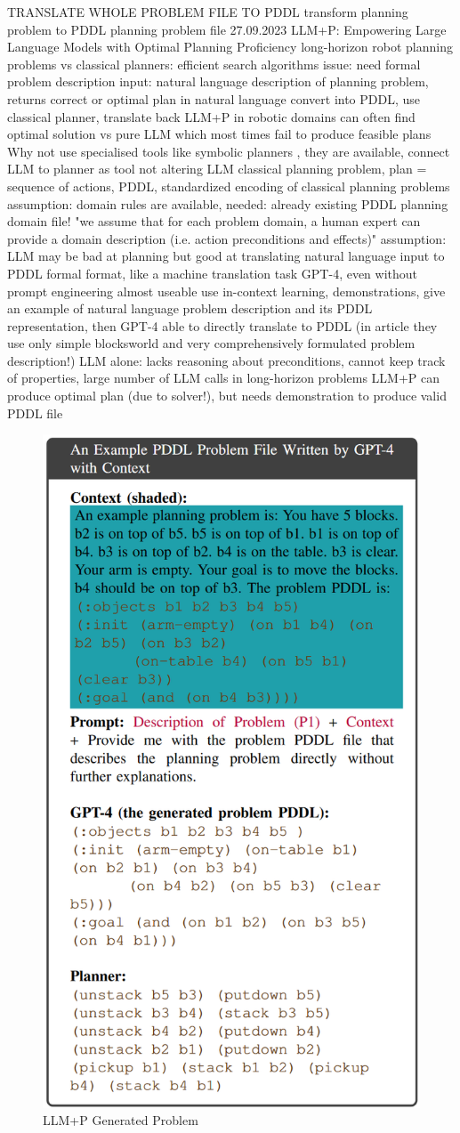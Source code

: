 \documentclass{article}
\begin{document}
TRANSLATE WHOLE PROBLEM FILE TO PDDL
transform planning problem to PDDL planning problem file
\cite{liu_llmp_2023} 27.09.2023 LLM+P: Empowering Large Language Models with Optimal Planning Proficiency
long-horizon robot planning problems
vs classical planners: efficient search algorithms
issue: need formal problem description
input: natural language description of planning problem, returns correct or optimal plan in natural language
convert into PDDL, use classical planner, translate back
LLM+P in robotic domains can often find optimal solution vs pure LLM which most times fail to produce feasible plans
Why not use specialised tools like symbolic planners , they are available, connect LLM to planner as tool
not altering LLM
classical planning problem, plan = sequence of actions, PDDL, standardized encoding of classical planning problems
assumption: domain rules are available, needed: already existing PDDL planning domain file! "we assume that for each problem domain, a human expert can provide a domain description (i.e. action preconditions and effects)"
assumption: LLM may be bad at planning but good at translating natural language input to PDDL formal format, like a machine translation task
GPT-4, even without prompt engineering almost useable
use in-context learning, demonstrations, give an example of natural language problem description and its PDDL representation, then GPT-4 able to directly translate to PDDL (in article they use only simple blocksworld and very comprehensively formulated problem description!)
LLM alone: lacks reasoning about preconditions, cannot keep track of properties, large number of LLM calls in long-horizon problems
LLM+P can produce optimal plan (due to solver!), but needs demonstration to produce valid PDDL file
\begin{figure}[h]
	\centering
	\includegraphics[width=0.4\linewidth]{LLMplusPGeneratedProblem.png}
	\caption{LLM+P Generated Problem \cite{liu_llmp_2023}}
	\label{fig:llmpluspgeneratedproblem}
\end{figure}
\end{document}
